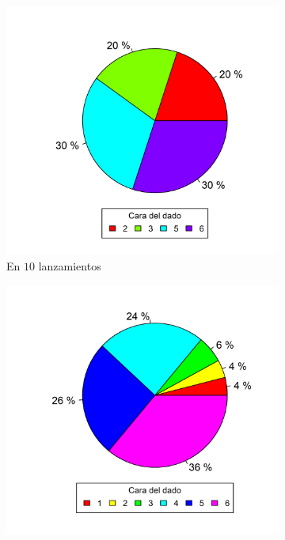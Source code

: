 \documentclass{article}
\begin{document}
\begin{figure}[h]
    \begin{center}
    \captionsetup{justification=centering}
    \begin{subfigure}{0.32\textwidth}
        \includegraphics[width=.99\linewidth]{Figures/dados10-.png}
        \caption{En $10$ lanzamientos}
    \end{subfigure}
    \begin{subfigure}{0.32\textwidth}
        \includegraphics[width=.99\linewidth]{Figures/dados50-.png}

\end{subfigure}
\end{center}
\end{figure}
\end{document}
